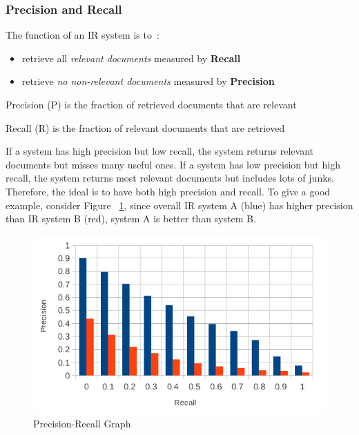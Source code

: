 \subsubsection{Precision and Recall}
The function of an IR system is to~\cite[P. 10]{eval}:
\begin{itemize}
 \item retrieve all \textit{relevant documents} measured by \textbf{Recall}
 \item retrieve \textit{no non-relevant documents} measured by \textbf{Precision}
\end{itemize}

Precision (P) is the fraction of retrieved documents that are relevant 
\begin{center}
\end{center}

Recall (R) is the fraction of relevant documents that are retrieved 
\begin{center}
\end{center}

If a system has high precision but low recall, the system returns relevant documents but misses many useful ones.
If a system has low precision but high recall, the system returns most relevant documents but includes lots of junks.
Therefore, the ideal is to have both high precision and recall. To give a good example, consider Figure ~\ref{fig:pr_example}, since
overall IR system A (blue) has higher precision than IR system B (red), system A is better than system B.

\begin{figure}
\centering
\includegraphics[scale=0.5]{./figures/pr_example.png}
\caption{Precision-Recall Graph} \label{fig:pr_example} 
\end{figure}

